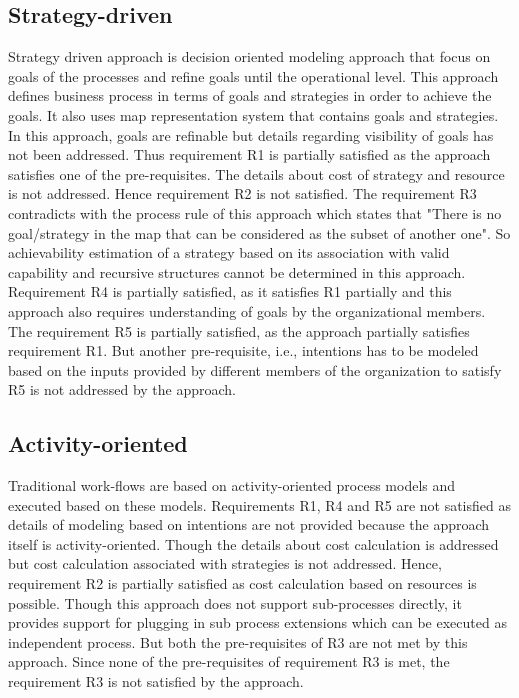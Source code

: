 \subsection{Strategy-driven} 
Strategy driven approach is decision oriented modeling approach that focus on goals of the processes and refine goals until the operational level. This approach defines business process in terms of goals and strategies in order to achieve the goals. It also uses map representation system that contains goals and strategies. In this approach, goals are refinable but details regarding visibility of goals has not been addressed. Thus requirement R1 is partially satisfied as the approach satisfies one of the pre-requisites. The details about cost of strategy and resource is not addressed. Hence requirement R2 is not satisfied. The requirement R3 contradicts with the process rule of this approach which states that "There is no goal/strategy in the map that can be considered as the subset of another one". So achievability estimation of a strategy based on its association with valid capability and recursive structures cannot be determined in this approach. Requirement R4 is partially satisfied, as it satisfies R1 partially and this approach also requires understanding of goals by the organizational members. The requirement R5 is partially satisfied, as the approach partially satisfies requirement R1. But another pre-requisite, i.e., intentions has to be modeled based on the inputs provided by different members of the organization to satisfy R5 is not addressed by the approach. 

\subsection{Activity-oriented} 
Traditional work-flows are based on activity-oriented process models and executed based on these models. Requirements R1, R4 and R5 are not satisfied as details of modeling based on intentions are not provided because the approach itself is activity-oriented. Though the details about cost calculation is addressed but cost calculation associated with strategies is not addressed. Hence, requirement R2 is partially satisfied as cost calculation based on resources is possible. Though this approach does not support sub-processes directly, it provides support for plugging in sub process extensions which can be executed as independent process. But both the pre-requisites of R3 are not met by this approach. Since none of the pre-requisites of requirement R3 is met, the requirement R3 is not satisfied by the approach. 

